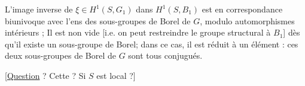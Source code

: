 L'image inverse de $\xi\in H^1(S,G_1)$ dans $H^1(S,B_1)$ est en correspondance biunivoque avec l'ens des sous-groupes de Borel de $G$, modulo automorphismes intérieurs ; Il est non vide [i.e. on peut restreindre le groupe structural à $B_1$] dès qu'il existe un sous-groupe de Borel; dans ce cas, il est réduit à un élément : ces deux sous-groupes de Borel de $G$ sont tous conjugués. 


[\uline{Question} ? Cette    ? Si $S$ est local ?]
\margin{$\times$}
